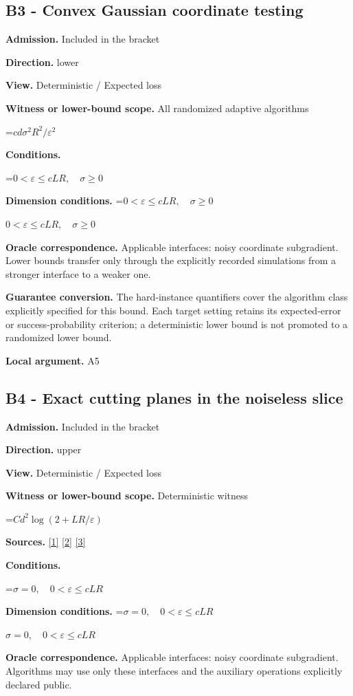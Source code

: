 \documentclass[10pt,a4paper]{article}
\newcommand{\AtlasMath}[1]{\par\begingroup\centering\setbox0=\hbox{$\displaystyle #1$}\ifdim\wd0>1.4\linewidth\typeout{ATLAS WIDE FORMULA: \the\wd0}\fi\ifdim\wd0>\linewidth\resizebox{\linewidth}{!}{\box0}\else\box0\fi\par\endgroup}
\newcommand{\AtlasInlineMath}[1]{\begingroup\setbox0=\hbox{$#1$}\ifdim\wd0>.4\linewidth\endgroup\AtlasMath{#1}\else\endgroup$#1$\fi}
\begin{document}
\subsection{B3 - Convex Gaussian coordinate testing}
\textbf{Admission.} Included in the bracket

\textbf{Direction.} lower

\textbf{View.} Deterministic / Expected loss

\textbf{Witness or lower-bound scope.} All randomized adaptive algorithms

\AtlasMath{cd\sigma^2R^2/\varepsilon^2}
\textbf{Conditions.} 
\AtlasMath{0<\varepsilon\le cLR,\quad\sigma\ge0}


\textbf{Dimension conditions.} \AtlasInlineMath{0<\varepsilon\le cLR,\quad\sigma\ge0}

\textbf{Oracle correspondence.} Applicable interfaces: noisy coordinate subgradient. Lower bounds transfer only through the explicitly recorded simulations from a stronger interface to a weaker one.

\textbf{Guarantee conversion.} The hard-instance quantifiers cover the algorithm class explicitly specified for this bound. Each target setting retains its expected-error or success-probability criterion; a deterministic lower bound is not promoted to a randomized lower bound.

\textbf{Local argument.} A5

\subsection{B4 - Exact cutting planes in the noiseless slice}
\textbf{Admission.} Included in the bracket

\textbf{Direction.} upper

\textbf{View.} Deterministic / Expected loss

\textbf{Witness or lower-bound scope.} Deterministic witness

\AtlasMath{Cd^2\log(2+LR/\varepsilon)}
\textbf{Sources.} \href{https://arxiv.org/pdf/1405.4980}{[1]} \href{https://www2.isye.gatech.edu/~nemirovs/MOR_AccuracyCertificates.pdf}{[2]} \href{https://arxiv.org/pdf/2609.20701}{[3]}

\textbf{Conditions.} 
\AtlasMath{\sigma=0,\quad0<\varepsilon\le cLR}


\textbf{Dimension conditions.} \AtlasInlineMath{\sigma=0,\quad0<\varepsilon\le cLR}

\textbf{Oracle correspondence.} Applicable interfaces: noisy coordinate subgradient. Algorithms may use only these interfaces and the auxiliary operations explicitly declared public.
\end{document}
